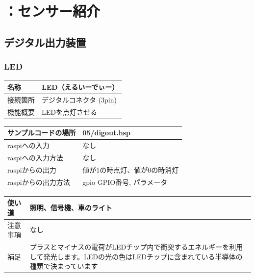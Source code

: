\section{：センサー紹介}\label{sensor_intr}
\subsection{デジタル出力装置}

\newlength{\colF}
\setlength{\colF}{0.25\columnwidth}
\newlength{\colG}
\setlength{\colG}{0.65\columnwidth}
\newlength{\colH}
\setlength{\colH}{0.1\columnwidth}
\newlength{\colI}
\setlength{\colI}{0.35\columnwidth}

\subsubsection{LED}\label{LED}
\begin{table}[H]
	\begin{tabular}{|p{\colF}|p{\colG}|}	\hline
	名称 & LED（えるいーでぃー）\\ \hline
	接続箇所 & デジタルコネクタ (3pin)\\ \hline
	機能概要 & LEDを点灯させる\\ \hline
  \end{tabular}
\end{table}

\begin{table}[H]
	\begin{tabular}{|p{\colF}|p{\colG}|}	\hline
	サンプルコードの場所 & 05/digout.hsp\\ \hline
	raspiへの入力 & なし\\ \hline
	raspiへの入力方法 & なし\\ \hline
	raspiからの出力 & 値が1の時点灯、値が0の時消灯\\ \hline
	raspiからの出力方法 & gpio GPIO番号, パラメータ\\ \hline
  \end{tabular}
\end{table}

\begin{table}[H]
	\begin{tabular}{|p{\colF}|p{\colG}|} \hline
	使い道 & 照明、信号機、車のライト\\ \hline
	注意事項 & なし\\ \hline
	補足 & プラスとマイナスの電荷がLEDチップ内で衝突するエネルギーを利用して発光します。LEDの光の色はLEDチップに含まれている半導体の種類で決まっています\\ \hline
  \end{tabular}
\end{table}

